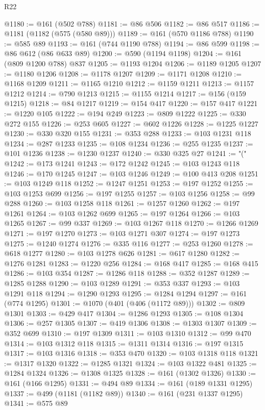 \begin{lexlean}{R22}
\begin{coremodule}
{{{{{{{{{{{{{{{{{{{{{{{{{{{{{{{{{{{{{{{{{{{{{{{{{{{{@1180 := @161 (@502 @788)
@1181 := @86 @506
@1182 := @86 @517
@1186 := @1181 (@1182 (@575 (@580 @89)))
@1189 := @161 (@570 @1186 @788)
@1190 := @585 @89
@1193 := @161 (@744 @1190 @788)
@1194 := @86 @599
@1198 := @86 @612 (@86 @633 @89)
@1200 := @590 (@1194 @1198)
@1204 := @161 (@809 @1200 @788) @837
@1205 := @1193 @1204
@1206 := @1189 @1205
@1207 := @1180 @1206
@1208 := @1178 @1207
@1209 := @1171 @1208
@1210 := @1168 @1209
@1211 := @1165 @1210
@1212 := @1159 @1211
@1213 := @1157 @1212
@1214 := @790 @1213
@1215 := @1155 @1214
@1217 := @156 (@159 @1215)
@1218 := @84 @1217
@1219 := @154 @417
@1220 := @157 @417
@1221 := @1220 @105
@1222 := @194 @249
@1223 := @809 @1222
@1225 := @330 @272 @155
@1226 := @253 @605
@1227 := @602 @1226
@1228 := @1225 @1227
@1230 := @330 @320 @155
@1231 := @353 @288
@1233 := @103 @1231 @118
@1234 := @287 @1233
@1235 := @108 @1234
@1236 := @255 @1235
@1237 := @101 @1236
@1238 := @1230 @1237
@1240 := @330 @325 @27
@1241 := "("
@1242 := @173 @1241
@1243 := @172 @1242
@1245 := @103 @1243 @118
@1246 := @170 @1245
@1247 := @103 @1246
@1249 := @100 @413 @208
@1251 := @103 @1249 @118
@1252 := @1247 @1251
@1253 := @197 @1252
@1255 := @103 @1253 @699
@1256 := @197 @1255
@1257 := @103 @1256
@1258 := @99 @288
@1260 := @103 @1258 @118
@1261 := @1257 @1260
@1262 := @197 @1261
@1264 := @103 @1262 @699
@1265 := @197 @1264
@1266 := @103 @1265
@1267 := @99 @337
@1269 := @103 @1267 @118
@1270 := @1266 @1269
@1271 := @197 @1270
@1273 := @103 @1271 @307
@1274 := @197 @1273
@1275 := @1240 @1274
@1276 := @335 @116
@1277 := @253 @1260
@1278 := @618 @1277
@1280 := @103 @1278 @626
@1281 := @617 @1280
@1282 := @1276 @1281
@1283 := @1220 @256
@1284 := @168 @417
@1285 := @168 @415
@1286 := @103 @354
@1287 := @1286 @118
@1288 := @352 @1287
@1289 := @1285 @1288
@1290 := @103 @1289
@1291 := @353 @337
@1293 := @103 @1291 @118
@1294 := @1290 @1293
@1295 := @1284 @1294
@1297 := @161 (@774 @1295)
@1301 := @1070 (@401 (@406 (@1172 @89)))
@1302 := @809 @1301
@1303 := @429 @417
@1304 := @1286 @1293
@1305 := @108 @1304
@1306 := @257 @1305
@1307 := @419 @1306
@1308 := @1303 @1307
@1309 := @352 @699
@1310 := @197 @1309
@1311 := @103 @1310
@1312 := @99 @470
@1314 := @103 @1312 @118
@1315 := @1311 @1314
@1316 := @197 @1315
@1317 := @103 @1316
@1318 := @353 @470
@1320 := @103 @1318 @118
@1321 := @1317 @1320
@1322 := @1285 @1321
@1324 := @103 @1322 @481
@1325 := @1284 @1324
@1326 := @1308 @1325
@1328 := @161 (@1302 @1326)
@1330 := @161 (@166 @1295)
@1331 := @494 @89
@1334 := @161 (@189 @1331 @1295)
@1337 := @499 (@1181 (@1182 @89))
@1340 := @161 (@231 @1337 @1295)
@1341 := @575 @89
}}}}}}}}}}}}}}}}}}}}}}}}}}}}}}}}}}}}}}}}}}}}}}}}}}}}
\end{coremodule}
\end{lexlean}
